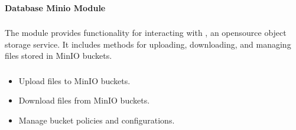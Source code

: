 \documentclass[letterpaper,10pt,english]{sphinxmanual}
\begin{document}
\paragraph{Database Minio Module}
\label{\detokenize{src.database:module-src.database.minio}}\label{\detokenize{src.database:database-minio-module}}\subsubsection*{}

\sphinxAtStartPar
The  module provides functionality for interacting with , an open\sphinxhyphen{}source object storage service. It includes methods for uploading, downloading, and managing files stored in MinIO buckets.
\subsubsection*{}
\begin{itemize}
\item {} 
\sphinxAtStartPar
Upload files to MinIO buckets.

\item {} 
\sphinxAtStartPar
Download files from MinIO buckets.

\item {} 
\sphinxAtStartPar
Manage bucket policies and configurations.

\end{itemize}
\end{document}

